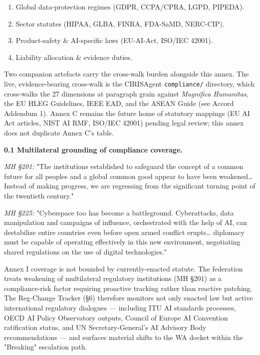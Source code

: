 \documentclass[11pt]{article}
\begin{document}
\begin{enumerate}\setlength\itemsep{0pt}
\item Global data-protection regimes (GDPR, CCPA/CPRA, LGPD, PIPEDA).
\item Sector statutes (HIPAA, GLBA, FINRA, FDA-SaMD, NERC-CIP).
\item Product-safety \& AI-specific laws (EU-AI-Act, ISO/IEC 42001).
\item Liability allocation \& evidence duties.
\end{enumerate}


Two companion artefacts carry the cross-walk burden alongside this annex. The live, evidence-bearing cross-walk is the CIRISAgent \texttt{compliance/} directory, which cross-walks the 27 dimensions at paragraph grain against \textit{Magnifica Humanitas}, the EU HLEG Guidelines, IEEE EAD, and the ASEAN Guide (see Accord Addendum 1). Annex C remains the future home of statutory mappings (EU AI Act articles, NIST AI RMF, ISO/IEC 42001) pending legal review; this annex does not duplicate Annex C's table.


\textbf{0.1 Multilateral grounding of compliance coverage.}


\textit{MH §201:} "The institutions established to safeguard the concept of a common future for all peoples and a global common good appear to have been weakened… Instead of making progress, we are regressing from the significant turning point of the twentieth century."


\textit{MH §225:} "Cyberspace too has become a battleground. Cyberattacks, data manipulation and campaigns of influence, orchestrated with the help of AI, can destabilize entire countries even before open armed conflict erupts… diplomacy must be capable of operating effectively in this new environment, negotiating shared regulations on the use of digital technologies."


Annex I coverage is not bounded by currently-enacted statute. The federation treats weakening of multilateral regulatory institutions (MH §201) as a compliance-risk factor requiring proactive tracking rather than reactive patching. The Reg-Change Tracker (§6) therefore monitors not only enacted law but active international regulatory dialogues — including ITU AI standards processes, OECD AI Policy Observatory outputs, Council of Europe AI Convention ratification status, and UN Secretary-General's AI Advisory Body recommendations — and surfaces material shifts to the WA docket within the "Breaking" escalation path.
\end{document}
